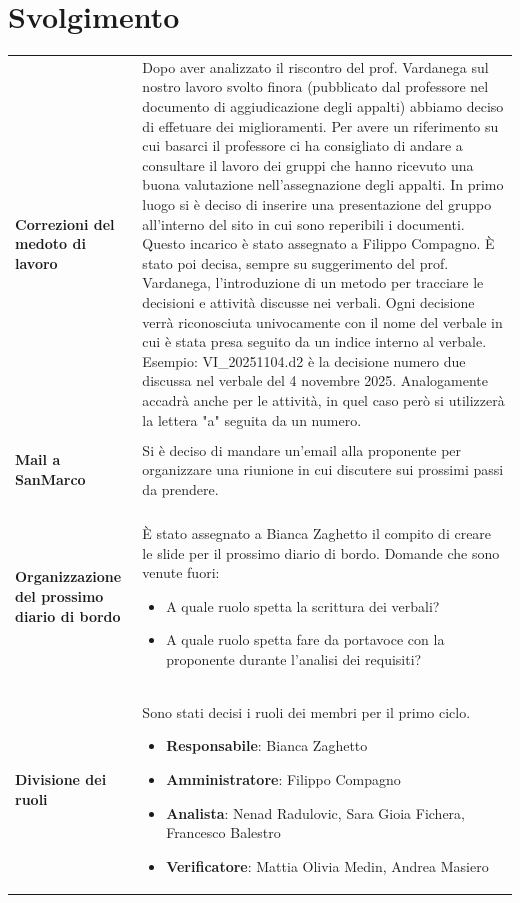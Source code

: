 \documentclass[a4paper,12pt]{article}
\begin{document}
\section{Svolgimento}
\begin{longtable}{P{5cm}|P{10cm}} 
    \textbf{Correzioni del medoto di lavoro} & Dopo aver analizzato il riscontro del prof. Vardanega sul nostro lavoro svolto finora (pubblicato dal professore nel documento di aggiudicazione degli appalti) abbiamo deciso di effetuare dei miglioramenti. Per avere un riferimento su cui basarci il professore ci ha consigliato di andare a consultare il lavoro dei gruppi che hanno ricevuto una buona valutazione nell'assegnazione degli appalti. 
    In primo luogo si è deciso di inserire una presentazione del gruppo all'interno del sito in cui sono reperibili i documenti. Questo incarico è stato assegnato a Filippo Compagno.
    È stato poi decisa, sempre su suggerimento del prof. Vardanega, l'introduzione di un metodo per tracciare le decisioni e attività discusse nei verbali. Ogni decisione verrà riconosciuta univocamente con il nome del verbale in cui è stata presa seguito da un indice interno al verbale. Esempio: VI\_20251104.d2 è la decisione numero due discussa nel verbale del 4 novembre 2025. Analogamente accadrà anche per le attività, in quel caso però si utilizzerà la lettera "a" seguita da un numero. \\
    \\
    \textbf{Mail a SanMarco} & Si è deciso di mandare un'email alla proponente per organizzare una riunione in cui discutere sui prossimi passi da prendere.\\\\

    \textbf{Organizzazione del prossimo diario di bordo} & È stato assegnato a Bianca Zaghetto il compito di creare le slide per il prossimo diario di bordo.
    Domande che sono venute fuori:
    \begin{itemize}
        \item A quale ruolo spetta la scrittura dei verbali?
        \item A quale ruolo spetta fare da portavoce con la proponente durante l'analisi dei requisiti?
    \end{itemize}\\

    \textbf{Divisione dei ruoli} & Sono stati decisi i ruoli dei membri per il primo ciclo.
    \begin{itemize}
        \item \textbf{Responsabile}: Bianca Zaghetto
        \item \textbf{Amministratore}: Filippo Compagno
        \item \textbf{Analista}: Nenad Radulovic, Sara Gioia Fichera, Francesco Balestro
        \item \textbf{Verificatore}: Mattia Olivia Medin, Andrea Masiero
    \end{itemize}\\
    

\end{longtable}
\end{document}
